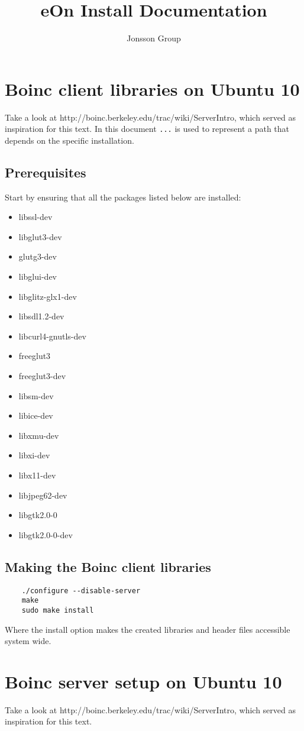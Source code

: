 \documentclass{article}
\begin{document}
\title{eOn Install Documentation}
\author{Jonsson	 Group}
\maketitle


\section{Boinc client libraries on Ubuntu 10}
Take a look at http://boinc.berkeley.edu/trac/wiki/ServerIntro, which served as inspiration for this text. In this document \texttt{...} is used to represent a path that depends on the specific installation.
%
\subsection{Prerequisites}
Start by ensuring that all the packages listed below are installed:
\begin{itemize}
\item libssl-dev
\item libglut3-dev
\item glutg3-dev
\item libglui-dev
\item libglitz-glx1-dev
\item libsdl1.2-dev
\item libcurl4-gnutls-dev
\item freeglut3
\item freeglut3-dev
\item libsm-dev
\item libice-dev
\item libxmu-dev
\item libxi-dev
\item libx11-dev
\item libjpeg62-dev
\item libgtk2.0-0
\item libgtk2.0-0-dev
\end{itemize}
%
\subsection{Making the Boinc client libraries}
\begin{verbatim}
	./configure --disable-server
	make
	sudo make install
\end{verbatim}
Where the install option makes the created libraries and header files accessible system wide.
%
\section{Boinc server setup on Ubuntu 10}
Take a look at http://boinc.berkeley.edu/trac/wiki/ServerIntro, which served as inspiration for this text.
%
\end{document}

